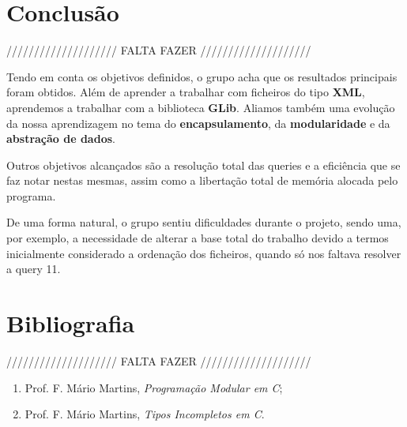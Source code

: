 \documentclass[a4paper]{article}
\begin{document}
\section{Conclusão}
\label{sec:conclusao}

//////////////////// FALTA FAZER ////////////////////

Tendo em conta os objetivos definidos, o grupo acha que os resultados 
principais foram obtidos. Além de aprender a trabalhar com ficheiros 
do tipo \textbf{XML}, aprendemos a trabalhar com a biblioteca \textbf{GLib}.
Aliamos também uma evolução da nossa aprendizagem no tema do 
\textbf{encapsulamento}, da \textbf{modularidade} e 
da \textbf{abstração de dados}.

Outros objetivos alcançados são a resolução total das queries e a eficiência
que se faz notar nestas mesmas, assim como a libertação total de memória 
alocada pelo programa.

De uma forma natural, o grupo sentiu dificuldades durante o projeto, sendo 
uma, por exemplo, a necessidade de alterar a base total do trabalho devido
a termos inicialmente considerado a ordenação dos ficheiros, quando só nos
faltava resolver a query 11.

\section{Bibliografia}

//////////////////// FALTA FAZER ////////////////////

\begin{enumerate} 
	\item Prof. F. Mário Martins, \textit{Programação Modular em C};
	\item Prof. F. Mário Martins, \textit{Tipos Incompletos em C}.
\end{enumerate}
\end{document}
